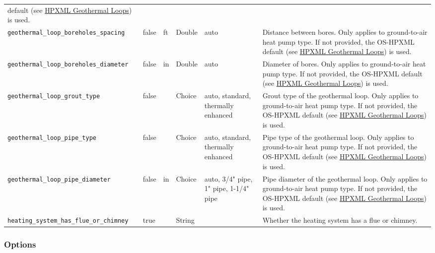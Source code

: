 \begin{longtable}[]{@{}llllll@{}}
default (see
\href{https://openstudio-hpxml.readthedocs.io/en/v1.7.0/workflow_inputs.html\#hpxml-geothermal-loops}{HPXML
Geothermal Loops}) is used. \\
\texttt{geothermal\_loop\_boreholes\_spacing} & false & ft & Double &
auto & Distance between bores. Only applies to ground-to-air heat pump
type. If not provided, the OS-HPXML default (see
\href{https://openstudio-hpxml.readthedocs.io/en/v1.7.0/workflow_inputs.html\#hpxml-geothermal-loops}{HPXML
Geothermal Loops}) is used. \\
\texttt{geothermal\_loop\_boreholes\_diameter} & false & in & Double &
auto & Diameter of bores. Only applies to ground-to-air heat pump type.
If not provided, the OS-HPXML default (see
\href{https://openstudio-hpxml.readthedocs.io/en/v1.7.0/workflow_inputs.html\#hpxml-geothermal-loops}{HPXML
Geothermal Loops}) is used. \\
\texttt{geothermal\_loop\_grout\_type} & false & & Choice & auto,
standard, thermally enhanced & Grout type of the geothermal loop. Only
applies to ground-to-air heat pump type. If not provided, the OS-HPXML
default (see
\href{https://openstudio-hpxml.readthedocs.io/en/v1.7.0/workflow_inputs.html\#hpxml-geothermal-loops}{HPXML
Geothermal Loops}) is used. \\
\texttt{geothermal\_loop\_pipe\_type} & false & & Choice & auto,
standard, thermally enhanced & Pipe type of the geothermal loop. Only
applies to ground-to-air heat pump type. If not provided, the OS-HPXML
default (see
\href{https://openstudio-hpxml.readthedocs.io/en/v1.7.0/workflow_inputs.html\#hpxml-geothermal-loops}{HPXML
Geothermal Loops}) is used. \\
\texttt{geothermal\_loop\_pipe\_diameter} & false & in & Choice & auto,
3/4" pipe, 1" pipe, 1-1/4" pipe & Pipe diameter of the geothermal loop.
Only applies to ground-to-air heat pump type. If not provided, the
OS-HPXML default (see
\href{https://openstudio-hpxml.readthedocs.io/en/v1.7.0/workflow_inputs.html\#hpxml-geothermal-loops}{HPXML
Geothermal Loops}) is used. \\
\texttt{heating\_system\_has\_flue\_or\_chimney} & true & & String & &
Whether the heating system has a flue or chimney. \\
\end{longtable}

\subsubsection{Options}\label{options-71}

